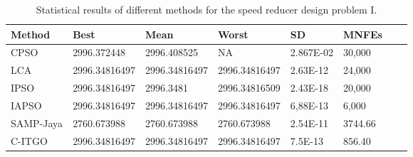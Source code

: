 
\begin{table*}[tp]
    \tiny
    \begin{center}
    
    \begin{tabular}{ P{2.0cm} P{2.0cm} P{2.0cm} P{2.0cm} P{2.0cm} P{2.0cm} P{2.0cm} P{2.0cm}  }
    \hline
    \textbf{Method} & \textbf{Best} & \textbf{Mean} & \textbf{Worst} & \textbf{SD} & \textbf{MNFEs} \\
    \hline
    
    CPSO & 2996.372448 & 2996.408525 & NA & 2.867E-02 & 30,000 \\
    LCA & 2996.34816497 & 2996.34816497 & 2996.34816497 & 2.63E-12 & 24,000 \\
    IPSO & 2996.34816497 & 2996.3481 & 2996.34816509 & 2.43E-18 & 20,000 \\
    IAPSO & 2996.34816497 & 2996.34816497 & 2996.34816497 & 6,88E-13 & 6,000 \\
    SAMP-Jaya & 2760.673988 & 2760.673988 & 2760.673988 & 2.54E-11 & 3744.66 \\    
    C-ITGO & 2996.34816497 & 2996.34816497 & 2996.34816497 & 7.5E-13 & 856.40 \\
        
    \hline
    \end{tabular}
    \end{center}
    
    \caption{ Statistical results of different methods for the speed reducer design problem I. \\[1em]}
    \label{tab:SP1}
    \end{table*}
    
    